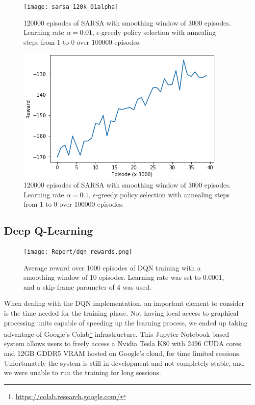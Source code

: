 \documentclass[letterpaper]{article} %
\begin{document}
\begin{figure}[h]
  \texttt{[image: sarsa\_120k\_01alpha]}
  \caption{120000 episodes of SARSA with smoothing window of 3000 episodes. Learning rate $\alpha = 0.01$, $\epsilon$-greedy policy selection with annealing steps from 1 to 0 over 100000 episodes. }
\label{100ksmalleralpha}

  \includegraphics[width = \columnwidth]{sarsa_120k_3kwindow}
  \caption{120000 episodes of SARSA with smoothing window of 3000 episodes. Learning rate $\alpha = 0.1$, $\epsilon$-greedy policy selection with annealing steps from 1 to 0 over 100000 episodes. }
\label{100k}
\end{figure}



\subsection{Deep Q-Learning}

\begin{figure}[h]
  \centering
  \texttt{[image: Report/dqn\_rewards.png]}
  \caption{Average reward over 1000 episodes of DQN training with a smoothing window of 10 episodes. Learning rate was set to 0.0001, and a skip-frame parameter of 4 was used.}
  \label{dqn_rew}
\end{figure}

When dealing with the DQN implementation, an important element to consider is the time needed for the training phase. Not having local access to graphical processing units capable of speeding up the learning process, we ended up taking advantage of Google's Colab\footnote{\url{https://colab.research.google.com/}} infrastructure. This Jupyter Notebook based system allows users to freely access a Nvidia Tesla K80 with 2496 CUDA cores and 12GB GDDR5 VRAM hosted on Google's cloud, for time limited sessions. Unfortunately the system is still in development and not completely stable, and we were unable to run the training for long sessions.
\end{document}
